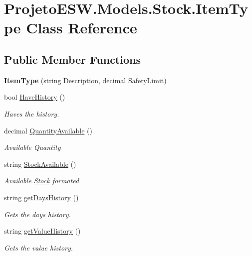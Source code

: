 \hypertarget{class_projeto_e_s_w_1_1_models_1_1_stock_1_1_item_type}{}\section{Projeto\+E\+S\+W.\+Models.\+Stock.\+Item\+Type Class Reference}
\label{class_projeto_e_s_w_1_1_models_1_1_stock_1_1_item_type}
\subsection*{Public Member Functions}
\begin{DoxyCompactItemize}
\item 
\mbox{\label{class_projeto_e_s_w_1_1_models_1_1_stock_1_1_item_type_ae7efd9413661655bc43d95de56238c4e}} 
{\bfseries Item\+Type} (string Description, decimal Safety\+Limit)
\item 
bool \mbox{\hyperlink{class_projeto_e_s_w_1_1_models_1_1_stock_1_1_item_type_a8c46efcb5e13ab28e06b5ca1e4cdf019}{Have\+History}} ()
\begin{DoxyCompactList}\small\item\em Haves the history.\end{DoxyCompactList}\item 
decimal \mbox{\hyperlink{class_projeto_e_s_w_1_1_models_1_1_stock_1_1_item_type_a5046421fbe274e5364cc71537ad9ca48}{Quantity\+Available}} ()
\begin{DoxyCompactList}\small\item\em Available Quantity\end{DoxyCompactList}\item 
string \mbox{\hyperlink{class_projeto_e_s_w_1_1_models_1_1_stock_1_1_item_type_a60a0facfc74bd8e9f06fdb1fceaf95ee}{Stock\+Available}} ()
\begin{DoxyCompactList}\small\item\em Available \mbox{\hyperlink{namespace_projeto_e_s_w_1_1_models_1_1_stock}{Stock}} formated\end{DoxyCompactList}\item 
string \mbox{\hyperlink{class_projeto_e_s_w_1_1_models_1_1_stock_1_1_item_type_add89e19f26f3025006d5ab98fb5299ca}{get\+Days\+History}} ()
\begin{DoxyCompactList}\small\item\em Gets the days history.\end{DoxyCompactList}\item 
string \mbox{\hyperlink{class_projeto_e_s_w_1_1_models_1_1_stock_1_1_item_type_ac9b709848630ba9365d5096d79b8eb8b}{get\+Value\+History}} ()
\begin{DoxyCompactList}\small\item\em Gets the value history.\end{DoxyCompactList}\end{DoxyCompactItemize}
